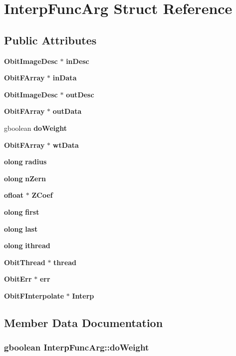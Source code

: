\section{Interp\-Func\-Arg Struct Reference}
\label{structInterpFuncArg}
\subsection*{Public Attributes}
\begin{CompactItemize}
\item 
{\bf Obit\-Image\-Desc} $\ast$ {\bf in\-Desc}
\item 
{\bf Obit\-FArray} $\ast$ {\bf in\-Data}
\item 
{\bf Obit\-Image\-Desc} $\ast$ {\bf out\-Desc}
\item 
{\bf Obit\-FArray} $\ast$ {\bf out\-Data}
\item 
gboolean {\bf do\-Weight}
\item 
{\bf Obit\-FArray} $\ast$ {\bf wt\-Data}
\item 
{\bf olong} {\bf radius}
\item 
{\bf olong} {\bf n\-Zern}
\item 
{\bf ofloat} $\ast$ {\bf ZCoef}
\item 
{\bf olong} {\bf first}
\item 
{\bf olong} {\bf last}
\item 
{\bf olong} {\bf ithread}
\item 
{\bf Obit\-Thread} $\ast$ {\bf thread}
\item 
{\bf Obit\-Err} $\ast$ {\bf err}
\item 
{\bf Obit\-FInterpolate} $\ast$ {\bf Interp}
\end{CompactItemize}


\subsection{Member Data Documentation}
\subsubsection{\setlength{\rightskip}{0pt plus 5cm}gboolean {\bf Interp\-Func\-Arg::do\-Weight}}\label{structInterpFuncArg_o4}


